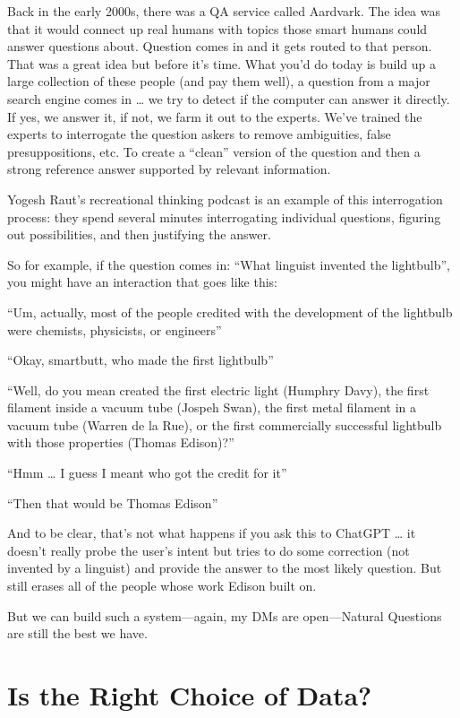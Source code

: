 Back in the early 2000s, there was a QA service called Aardvark.  The idea was that it would connect up real humans with topics those smart humans could answer questions about.  Question comes in and it gets routed to that person.  That was a great idea but before it’s time.  What you’d do today is build up a large collection of these people (and pay them well), a question from a major search engine comes in … we try to detect if the computer can answer it directly.  If yes, we answer it, if not, we farm it out to the experts.  We’ve trained the experts to interrogate the question askers to remove ambiguities, false presuppositions, etc.  To create a “clean” version of the question and then a strong reference answer supported by relevant information.

Yogesh Raut’s recreational thinking podcast is an example of this interrogation process: they spend several minutes interrogating individual questions, figuring out possibilities, and then justifying the answer.

So for example, if the question comes in: “What linguist invented the lightbulb”, you might have an interaction that goes like this:

“Um, actually, most of the people credited with the development of the lightbulb were chemists, physicists, or engineers”

“Okay, smartbutt, who made the first lightbulb”

“Well, do you mean created the first electric light (Humphry Davy), the first filament inside a vacuum tube (Jospeh Swan), the first metal filament in a vacuum tube (Warren de la Rue), or the first commercially successful lightbulb with those properties (Thomas Edison)?”

“Hmm … I guess I meant who got the credit for it”

“Then that would be Thomas Edison”

And to be clear, that’s not what happens if you ask this to ChatGPT … it doesn’t really probe the user’s intent but tries to do some correction (not invented by a linguist) and provide the answer to the most likely question.  But still erases all of the people whose work Edison built on.

But we can build such a system—again, my DMs are open—Natural Questions are still the best we have.

\section{Is  the Right Choice of Data?}
\label{sec:nq:iid}

